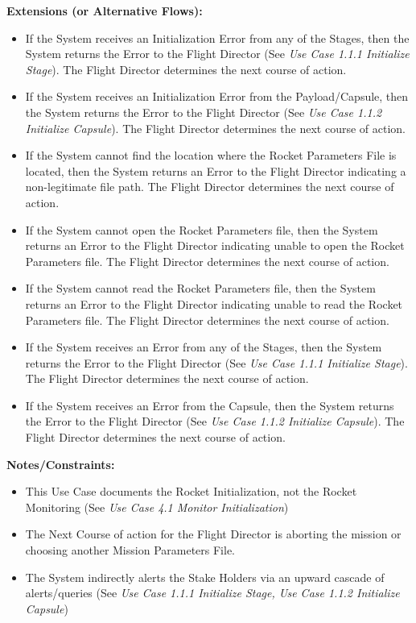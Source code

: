 \documentclass[letterpaper]{article}
\begin{document}
\textbf{Extensions (or Alternative Flows):}
\begin{itemize}
    \item[2a]If the System receives an Initialization Error from any
       of the Stages, then the System returns the Error to the Flight
       Director (See 
       \textit{Use Case 1.1.1 Initialize Stage}).  The Flight Director
       determines the next course of action.
    \item[3a]If the System receives an Initialization Error from the
       Payload/Capsule, then the System returns the Error to the 
       Flight Director (See 
       \textit{Use Case 1.1.2 Initialize Capsule}).  The Flight 
       Director determines the next course of action.
    \item[4a,5a]If the System cannot find the location where the
       Rocket Parameters File is located, then the System returns an
       Error to the Flight Director indicating a non-legitimate file
       path.  The Flight Director determines the next course of 
       action.
    \item[6a]If the System cannot open the Rocket Parameters file,
       then the System returns an Error to the Flight Director
       indicating unable to open the Rocket Parameters file.  The
       Flight Director determines the next course of action.
    \item[7a]If the System cannot read the Rocket Parameters file,
       then the System returns an Error to the Flight Director
       indicating unable to read the Rocket Parameters file.  The
       Flight Director determines the next course of action.
    \item[9a]If the System receives an Error from any of the Stages,
       then the System returns the Error to the Flight Director (See
       \textit{Use Case 1.1.1 Initialize Stage}).  The Flight Director
       determines the next course of action.
    \item[10a]If the System receives an Error from the Capsule, then
       the System returns the Error to the Flight Director (See
       \textit{Use Case 1.1.2 Initialize Capsule}).  The Flight
       Director determines the next course of action.
\end{itemize}
\textbf{Notes/Constraints:}
\begin{itemize}
   \item[*a]This Use Case documents the Rocket Initialization, not
      the Rocket Monitoring (See 
      \textit{Use Case 4.1 Monitor Initialization})
   \item[*b]The Next Course of action for the Flight Director is 
      aborting the mission or choosing another Mission Parameters 
      File.
   \item[11a]The System indirectly alerts the Stake Holders via an
      upward cascade of alerts/queries (See 
      \textit{Use Case 1.1.1 Initialize Stage,
      Use Case 1.1.2 Initialize Capsule})
\end{itemize}
\end{document}
